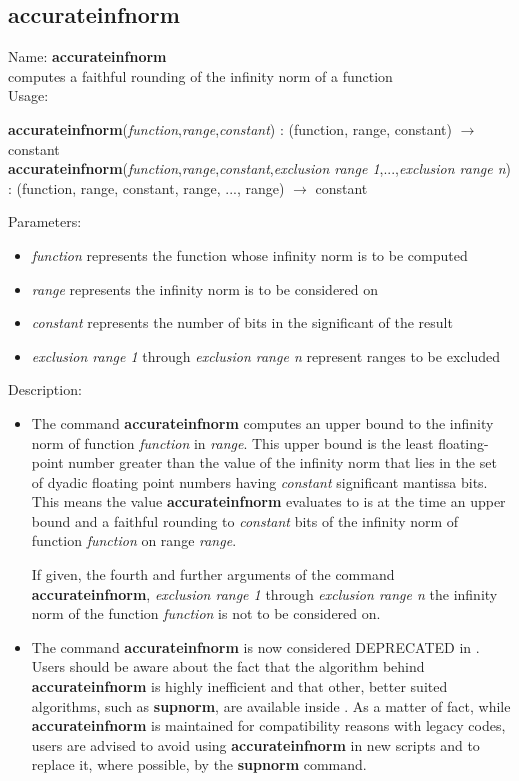 \subsection{accurateinfnorm}
\label{labaccurateinfnorm}
\noindent Name: \textbf{accurateinfnorm}\\
\phantom{aaa}computes a faithful rounding of the infinity norm of a function \\[0.2cm]
\noindent Usage: 
\begin{center}
\textbf{accurateinfnorm}(\emph{function},\emph{range},\emph{constant}) : (\textsf{function}, \textsf{range}, \textsf{constant}) $\rightarrow$ \textsf{constant}\\
\textbf{accurateinfnorm}(\emph{function},\emph{range},\emph{constant},\emph{exclusion range 1},...,\emph{exclusion range n}) : (\textsf{function}, \textsf{range}, \textsf{constant}, \textsf{range}, ..., \textsf{range}) $\rightarrow$ \textsf{constant}\\
\end{center}
Parameters: 
\begin{itemize}
\item \emph{function} represents the function whose infinity norm is to be computed
\item \emph{range} represents the infinity norm is to be considered on
\item \emph{constant} represents the number of bits in the significant of the result
\item \emph{exclusion range 1} through \emph{exclusion range n} represent ranges to be excluded 
\end{itemize}
\noindent Description: \begin{itemize}

\item The command \textbf{accurateinfnorm} computes an upper bound to the infinity norm of
   function \emph{function} in \emph{range}. This upper bound is the least
   floating-point number greater than the value of the infinity norm that
   lies in the set of dyadic floating point numbers having \emph{constant}
   significant mantissa bits. This means the value \textbf{accurateinfnorm} evaluates to
   is at the time an upper bound and a faithful rounding to \emph{constant}
   bits of the infinity norm of function \emph{function} on range \emph{range}.
    
   If given, the fourth and further arguments of the command \textbf{accurateinfnorm},
   \emph{exclusion range 1} through \emph{exclusion range n} the infinity norm of
   the function \emph{function} is not to be considered on.

\item The command \textbf{accurateinfnorm} is now considered DEPRECATED in \sollya.
   Users should be aware about the fact that the algorithm behind
   \textbf{accurateinfnorm} is highly inefficient and that other, better suited
   algorithms, such as \textbf{supnorm}, are available inside \sollya. As a
   matter of fact, while \textbf{accurateinfnorm} is maintained for compatibility reasons
   with legacy \sollya codes, users are advised to avoid using \textbf{accurateinfnorm}
   in new \sollya scripts and to replace it, where possible, by the
   \textbf{supnorm} command.
\end{itemize}
